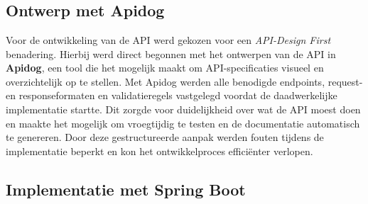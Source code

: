 
\chapter{}%
\label{ch:methodologie}


\section{Ontwerp met Apidog}

Voor de ontwikkeling van de API werd gekozen voor een \emph{API-Design First} benadering. Hierbij werd direct begonnen met het ontwerpen van de API in \textbf{Apidog}, een tool die het mogelijk maakt om API-specificaties visueel en overzichtelijk op te stellen. Met Apidog werden alle benodigde endpoints, request- en responseformaten en validatieregels vastgelegd voordat de daadwerkelijke implementatie startte. Dit zorgde voor duidelijkheid over wat de API moest doen en maakte het mogelijk om vroegtijdig te testen en de documentatie automatisch te genereren. Door deze gestructureerde aanpak werden fouten tijdens de implementatie beperkt en kon het ontwikkelproces efficiënter verlopen.

\section{Implementatie met Spring Boot}


